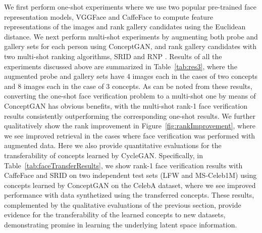 \documentclass[10pt,twocolumn,letterpaper]{article}
\begin{document}
We first perform one-shot experiments where we use two popular pre-trained face representation models, VGGFace \cite{vggface} and CaffeFace \cite{caffeface} to compute feature representations of the images and rank gallery candidates using the Euclidean distance. We next perform multi-shot experiments by augmenting both probe and gallery sets for each person using ConceptGAN, and rank gallery candidates with two multi-shot ranking algorithms, SRID \cite{srid,karanam2016systematic} and RNP \cite{rnp}. Results of all the experiments discussed above are summarized in Table~\ref{tab:res3}, where the augmented probe and gallery sets have 4 images each in the cases of two concepts and 8 images each in the case of 3 concepts. As can be noted from these results, converting the one-shot face verification problem to a multi-shot one by means of ConceptGAN has obvious benefits, with the multi-shot rank-1 face verification results consistently outperforming the corresponding one-shot results. We further qualitatively show the rank improvement in Figure~\ref{fig:rankImprovement}, where we see improved retrieval in the cases where face verification was performed with augmented data. %
Here we also provide quantitative evaluations for the transferability of concepts learned by CycleGAN. Specifically, in Table~\ref{tab:faceTransferResults}, we show rank-1 face verification results with CaffeFace and SRID on two independent test sets (LFW and MS-Celeb1M) using concepts learned by ConceptGAN on the CelebA dataset, where we see improved performance with data synthetized using the transferred concepts.  These results, complemented by the qualitative evaluations of the previous section, provide evidence for the transferability of the learned concepts to new datasets, demonstrating promise in learning the underlying latent space information.

\end{document}
